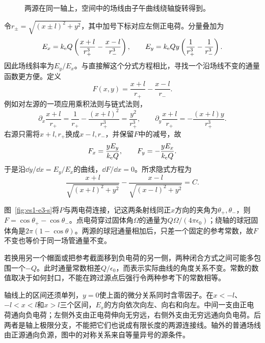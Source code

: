\begin{figure}[H]\centering
{}
\caption{两源在同一轴上，空间中的场线由子午曲线绕轴旋转得到。}\label{fig:es1-e3-q}
\end{figure}
\begin{solution}
令$r_\pm=\sqrt{(x\pm l)^2+y^2}$，其中加号下标对应左侧正电荷。分量叠加为
\[E_x=k_{\rm e} Q\left(\frac{x+l}{r_+^3}-\frac{x-l}{r_-^3}\right),\qquad
E_y=k_{\rm e} Qy\left(\frac1{r_+^3}-\frac1{r_-^3}\right).\]
因此场线斜率为$E_y/E_x$。与直接解这个分式方程相比，寻找一个沿场线不变的通量函数更方便。定义
\[F(x,y)=\frac{x+l}{r_+}-\frac{x-l}{r_-}.\]
例如对左源的一项应用乘积法则与链式法则，
\[\partial_x\frac{x+l}{r_+}=\frac1{r_+}-\frac{(x+l)^2}{r_+^3}=\frac{y^2}{r_+^3},\qquad
\partial_y\frac{x+l}{r_+}=-\frac{(x+l)y}{r_+^3}.\]
右源只需将$x+l,r_+$换成$x-l,r_-$，并保留$F$中的减号，故
\[F_x=\frac{yE_y}{k_{\rm e} Q},\qquad F_y=-\frac{yE_x}{k_{\rm e} Q}.
\]
于是沿$\dd y/\dd x=E_y/E_x$的曲线，$\dd F/\dd x=0$。所求隐式方程为
\[\boxed{\frac{x+l}{\sqrt{(x+l)^2+y^2}}
-\frac{x-l}{\sqrt{(x-l)^2+y^2}}=C}.\]

图~\ref{fig:es1-e3-s}将$P$与两电荷连接，记这两条射线同正$x$方向的夹角为$\theta_+,\theta_-$，则$F=\cos\theta_+-\cos\theta_-$。点电荷穿过固体角$\Omega$的通量为$Q\Omega/(4\pi\epsilon_0)$；绕轴的球冠固体角是$2\pi(1-\cos\theta)$。两源的球冠通量相加后，只差一个固定的参考常数，故$F$不变也等价于同一场管通量不变。

若换用另一个帽面或把参考截面移到负电荷的另一侧，两种闭合方式之间可能多包围一个$-Q$。此时通量常数相差$Q/\epsilon_0$，而表示实际曲线的角度关系不变。常数的数值取决于如何封口，不能在跨过源点后强行令两种参考下的常数相等。

轴线上的区间还须单列，$y=0$使上面的微分关系同时含零因子。在$x<-l$、$-l<x<l$和$x>l$三个区间，$E_x$的方向依次向左、向右和向左。中间一支由正电荷通向负电荷；左侧外支由正电荷伸向无穷远，右侧外支由无穷远通向负电荷。后两者是轴上极限分支，不能把它们也说成有限长度的两源连接线。轴外的普通场线由正源通向负源，图中的对称关系来自等量异号的源条件。
\begin{figure}[H]\centering
{}
\end{figure}
\end{solution}
